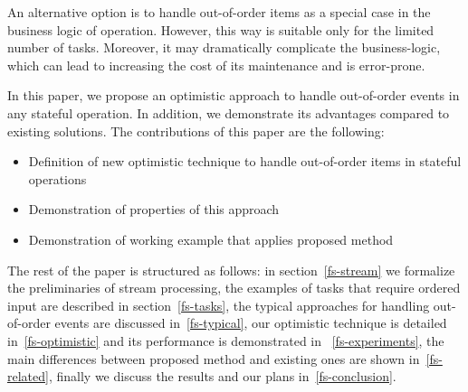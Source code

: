 An alternative option is to handle out-of-order items as a special case in the business logic of operation. However, this way is suitable only for the limited number of tasks. Moreover, it may dramatically complicate the business-logic, which can lead to increasing the cost of its maintenance and is error-prone.

In this paper, we propose an optimistic approach to handle out-of-order events in any stateful operation. In addition, we demonstrate its advantages compared to existing solutions. The contributions of this paper are the following: 

\begin {itemize}
\item Definition of new optimistic technique to handle out-of-order items in stateful operations
\item Demonstration of properties of this approach
\item Demonstration of working example that applies proposed method
\end {itemize}

The rest of the paper is structured as follows: in section~\ref{fs-stream} we formalize the preliminaries of stream processing, the examples of tasks that require ordered input are described in section~\ref{fs-tasks}, the typical approaches for handling out-of-order events are discussed in~\ref{fs-typical}, our optimistic technique is detailed in~\ref{fs-optimistic} and its performance is demonstrated in ~\ref{fs-experiments}, the main differences between proposed method and existing ones are shown in~\ref{fs-related}, finally we discuss the results and our plans in~\ref{fs-conclusion}.
